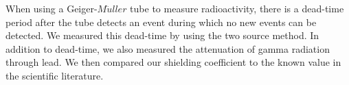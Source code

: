 \par When using a Geiger-$M\ddot{u}ller$ tube to measure radioactivity, there is a dead-time period after the tube detects an event during which no new events can be detected. We measured this dead-time by using the two source method. In addition to dead-time, we also measured the attenuation of gamma radiation through lead. We then compared our shielding coefficient to the known value in the scientific literature.